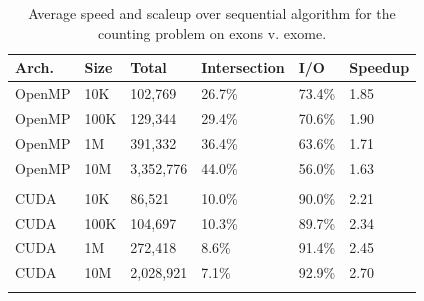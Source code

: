 \documentclass{bioinfo}
\begin{document}
	\begin{table}[h]
	\centering
	\begin{center}
		\begin{tabular}{l l l l l l}
			Arch. & Size & Total & Intersection & I/O & Speedup \\
			\hline
			\hline
			OpenMP & 10K & 102,769 & 26.7\% & 73.4\% & 1.85 \\
			OpenMP & 100K & 129,344 & 29.4\% & 70.6\% & 1.90 \\
			OpenMP & 1M & 391,332 & 36.4\% & 63.6\% & 1.71 \\
			OpenMP & 10M & 3,352,776 & 44.0\% & 56.0\% & 1.63 \\ 
			\\
			CUDA & 10K & 86,521 & 10.0\% & 90.0\% & 2.21 \\
			CUDA & 100K & 104,697 & 10.3\% & 89.7\% & 2.34 \\
			CUDA & 1M & 272,418 & 8.6\% & 91.4\% & 2.45 \\
			CUDA & 10M & 2,028,921 & 7.1\% & 92.9\% & 2.70 \\
			\\
		\end{tabular}
	\end{center}
	\label{table:avge}
	\caption{Average speed and scaleup over sequential algorithm for the counting problem on exons v. exome.}
	\end{table}
	
\end{document}
